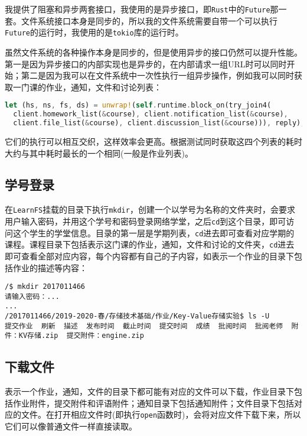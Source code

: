 \documentclass[12pt, UTF8]{article}
\begin{document}
我提供了阻塞和异步两套接口，我使用的是异步接口，即\lstinline|Rust|中的\lstinline|Future|那一套。文件系统接口本身是同步的，所以我的文件系统需要自带一个可以执行\lstinline|Future|的运行时，我使用的是\lstinline|tokio|库的运行时。

虽然文件系统的各种操作本身是同步的，但是使用异步的接口仍然可以提升性能。第一是因为异步接口的内部实现也是异步的，在内部请求一组URL时可以同时开始；第二是因为我可以在文件系统中一次性执行一组异步操作，例如我可以同时获取一门课的作业，通知，文件和讨论列表：

\begin{lstlisting}[language = Rust]
let (hs, ns, fs, ds) = unwrap!(self.runtime.block_on(try_join4(
  client.homework_list(&course), client.notification_list(&course),
  client.file_list(&course), client.discussion_list(&course))), reply);
\end{lstlisting}

它们的执行可以相互交织，这样效率会更高。根据测试同时获取这四个列表的耗时大约与其中耗时最长的一个相同(一般是作业列表)。

\subsection{学号登录}

在\lstinline|LearnFS|挂载的目录下执行\lstinline|mkdir|，创建一个以学号为名称的文件夹时，会要求用户输入密码，并用这个学号和密码登录网络学堂，之后\lstinline|cd|到这个目录，即可访问这个学生的学堂信息。目录的第一层是学期列表，\lstinline|cd|进去即可查看对应学期的课程。课程目录下包括表示这门课的作业，通知，文件和讨论的文件夹，\lstinline|cd|进去即可查看全部对应内容，每个内容都有自己的子内容，如表示一个作业的目录下包括作业的描述等内容：

\begin{lstlisting}[language = {}]
/$ mkdir 2017011466
请输入密码：...
...
/2017011466/2019-2020-春/存储技术基础/作业/Key-Value存储实验$ ls -U
提交作业  刷新  描述  发布时间  截止时间  提交时间  成绩  批阅时间  批阅老师  附件：KV存储.zip  提交附件：engine.zip
\end{lstlisting}

\subsection{下载文件}

表示一个作业，通知，文件的目录下都可能有对应的文件可以下载，作业目录下包括作业附件，提交附件和评语附件；通知目录下包括通知附件；文件目录下包括对应的文件。在打开相应文件时(即执行\lstinline|open|函数时)，会将对应文件下载下来，所以它们可以像普通文件一样直接读取。
\end{document}
